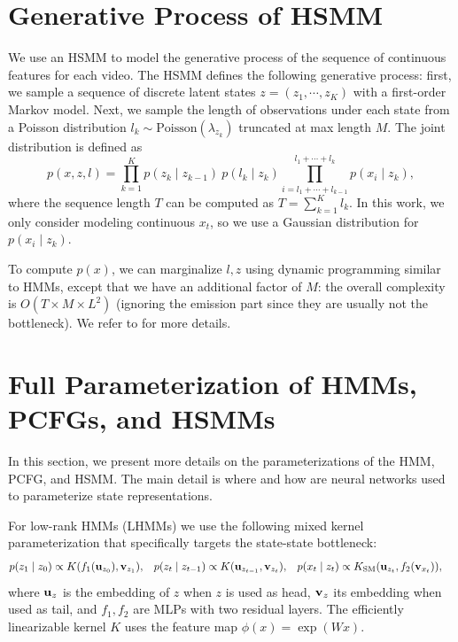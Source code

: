 \documentclass{article}
\begin{document}
\section{\label{sec:hsmm}Generative Process of HSMM} 

We use an HSMM to model the generative process of the sequence of continuous features for each video. The HSMM defines the following generative process: first, we sample a sequence of discrete latent states $z=(z_1, \cdots, z_K)$ with a first-order Markov model.
Next, we sample the length of observations under each state from a Poisson distribution $l_k\sim \text{Poisson}(\lambda_{z_k})$ truncated at max length $M$. The joint distribution is defined as
\begin{equation}
 \label{eqn:hsmmjoint}
     p(x, z, l) = \prod_{k=1}^K p(z_k \mid z_{k-1}) \ p(l_k \mid z_k)\prod_{i=l_1+\cdots+l_{k-1}}^{l_1+\cdots+l_k} p(x_i\mid z_k),
 \end{equation}
where the sequence length $T$ can be computed as $T=\sum_{k=1}^K l_k$. In this work, we only consider modeling continuous $x_t$, so we use a Gaussian distribution for $p(x_i\mid z_k)$.

To compute $p(x)$, we can marginalize $l, z$ using dynamic programming similar to HMMs, except that we have an additional factor of $M$: the overall complexity is $O(T\times M \times L^2)$ (ignoring the emission part since they are usually not the bottleneck). We refer to \citet{yu2010hidden} for more details.

\section{\label{sec:mlp-param}Full Parameterization of HMMs, PCFGs, and HSMMs}
In this section, we present more details on the parameterizations of the HMM, PCFG, and HSMM.
The main detail is where and how are neural networks used to parameterize state representations.

For low-rank HMMs (LHMMs) we  use the following mixed kernel parameterization that specifically targets the state-state bottleneck:
\begin{equation}
\begin{aligned}
p(z_1 \mid z_0) &\propto K(f_1(\mathbf{u}_{z_0}), \mathbf{v}_{z_1}), &
p(z_t \mid z_{t-1}) &\propto K(\mathbf{u}_{z_{t-1}}, \mathbf{v}_{z_t}), &
p(x_t \mid z_t) &\propto K_{\mathrm{SM}}(\mathbf{u}_{z_t}, f_2(\mathbf{v}_{x_t})),
\end{aligned}
\end{equation}
where $\mathbf{u}_{z}$ is the embedding of $z$ when $z$ is used as head, $\mathbf{v}_{z}$ its embedding when used as tail, and $f_1, f_2$ are MLPs with two residual layers. The efficiently linearizable kernel $K$ uses the feature map $\phi(x) = \exp(Wx)$. 
\end{document}
